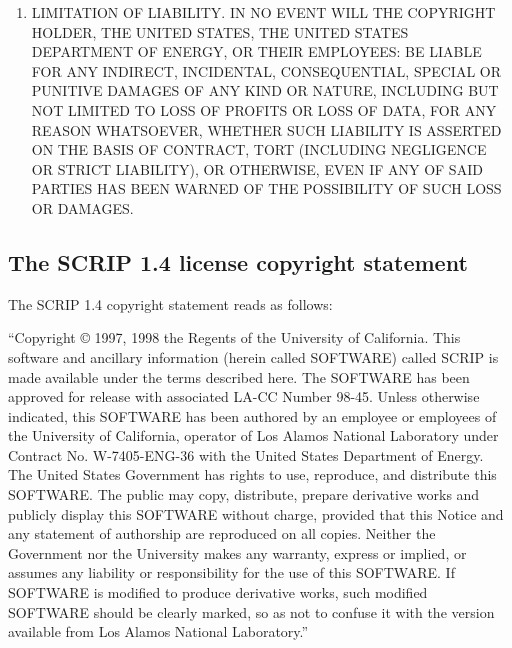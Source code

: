 \begin{enumerate}
\item LIMITATION OF LIABILITY. IN NO EVENT WILL THE COPYRIGHT HOLDER, THE UNITED STATES, THE UNITED STATES DEPARTMENT OF ENERGY, OR THEIR EMPLOYEES: BE LIABLE FOR ANY INDIRECT, INCIDENTAL, CONSEQUENTIAL, SPECIAL OR PUNITIVE DAMAGES OF ANY KIND OR NATURE, INCLUDING BUT NOT LIMITED TO LOSS OF PROFITS OR LOSS OF DATA, FOR ANY REASON WHATSOEVER, WHETHER SUCH LIABILITY IS ASSERTED ON THE BASIS OF CONTRACT, TORT (INCLUDING NEGLIGENCE OR STRICT LIABILITY), OR OTHERWISE, EVEN IF ANY OF SAID PARTIES HAS BEEN WARNED OF THE POSSIBILITY OF SUCH LOSS OR DAMAGES.

\end{enumerate}

\subsection{The SCRIP 1.4 license copyright statement}
\label{sec_SCRIP}

The SCRIP 1.4 copyright statement reads as follows:

 ``Copyright © 1997, 1998 the Regents of the
University of California.  This software and ancillary information
(herein called SOFTWARE) called SCRIP is made available under the
terms described here. The SOFTWARE has been approved for release with
associated LA-CC Number 98-45. Unless otherwise indicated, this
SOFTWARE has been authored by an employee or employees of the
University of California, operator of Los Alamos National Laboratory
under Contract No. W-7405-ENG-36 with the United States Department of
Energy. The United States Government has rights to use, reproduce, and
distribute this SOFTWARE. The public may copy, distribute, prepare
derivative works and publicly display this SOFTWARE without charge,
provided that this Notice and any statement of authorship are
reproduced on all copies. Neither the Government nor the University
makes any warranty, express or implied, or assumes any liability or
responsibility for the use of this SOFTWARE. If SOFTWARE is modified
to produce derivative works, such modified SOFTWARE should be clearly
marked, so as not to confuse it with the version available from Los
Alamos National Laboratory.''

